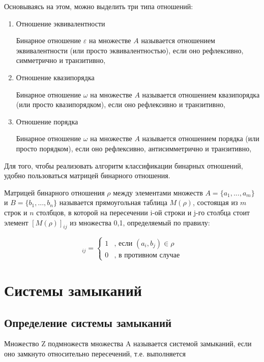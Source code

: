 \documentclass[bachelor, och, labwork]{shiza}
\begin{document}
	Основываясь на этом, можно выделить три типа отношений:
	
	\begin{enumerate}
		\item Отношение эквивалентности
		
		Бинарное отношение $\varepsilon $ на множестве $A$ называется отношением эквивалентности (или просто $\textit{эквивалентностью}$), если оно рефлексивно, симметрично и транзитивно,
		\item Отношение квазипорядка
		
		Бинарное отношение $\omega $ на множестве $A$ называется отношением квазипорядка (или просто $\textit{квазипорядком}$), если оно рефлексивно и транзитивно,
		\item Отношение порядка
		
		Бинарное отношение $\omega $ на множестве $A$ называется отношением порядка (или просто $\textit{порядком}$), если оно рефлексивно, антисимметрично и транзитивно,
	\end{enumerate}
		
	Для того, чтобы реализовать алгоритм классификации бинарных отношений, удобно пользоваться матрицей бинарного отношения.
	
	$\textit{Матрицей}$ бинарного отношения $\rho$ между элементами множеств $A = \{a_1, ..., a_m\}$ и $B = \{b_1, ..., b_n\}$ называется прямоугольная таблица $M(\rho)$, состоящая из $m$ строк и $n$ столбцов, в которой на пересечении i-ой строки и j-го столбца стоит элемент $[M(\rho)]_{ij}$ из множества {0,1}, определяемый по правилу:
	
	\begin{equation*}
		[M(\rho)]_{ij} =  
		\begin{cases}
			1 &\text{, если $(a_i, b_j) \in \rho$}\\
			0 &\text{, в противном случае}
		\end{cases}
	\end{equation*}


		\section{Системы замыканий}
	\subsection{Определение системы замыканий}
	
	Множество Z подмножеств множества A называется $\textit{системой замыканий}$, если оно замкнуто относительно пересечений, т.е. выполняется 
	
\end{document}
